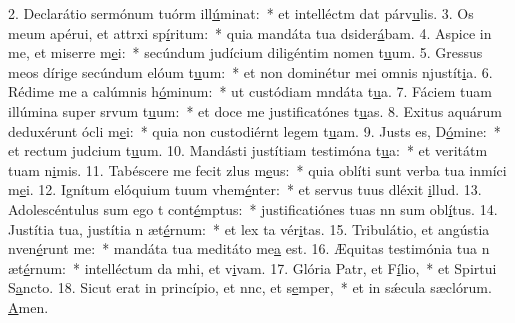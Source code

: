 2. Declarátio sermónum tuórm ill\uline{ú}minat:~* et intelléctm dat párv\uline{u}lis.
3. Os meum apérui, et attrxi sp\uline{í}ritum:~* quia mandáta tua dsider\uline{á}bam.
4. Aspice in me, et miserre m\uline{e}i:~* secúndum judícium diligéntim nomen t\uline{u}um.
5. Gressus meos dírige secúndum elóum t\uline{u}um:~* et non dominétur mei omnis njustít\uline{i}a.
6. Rédime me a calúmnis h\uline{ó}minum:~* ut custódiam mndáta t\uline{u}a.
7. Fáciem tuam illúmina super srvum t\uline{u}um:~* et doce me justificatónes t\uline{u}as.
8. Exitus aquárum deduxérunt ócli m\uline{e}i:~* quia non custodiérnt legem t\uline{u}am.
9. Justs es, D\uline{ó}mine:~* et rectum judcium t\uline{u}um.
10. Mandásti justítiam testimóna t\uline{u}a:~* et veritátm tuam n\uline{i}mis.
11. Tabéscere me fecit zlus m\uline{e}us:~* quia oblíti sunt verba tua inmíci m\uline{e}i.
12. Ignítum elóquium tuum vhem\uline{é}nter:~* et servus tuus dléxit \uline{i}llud.
13. Adolescéntulus sum ego t cont\uline{é}mptus:~* justificatiónes tuas nn sum obl\uline{í}tus.
14. Justítia tua, justítia n æt\uline{é}rnum:~* et lex ta vér\uline{i}tas.
15. Tribulátio, et angústia nven\uline{é}runt me:~* mandáta tua meditáto me\uline{a} est.
16. Æquitas testimónia tua n æt\uline{é}rnum:~* intelléctum da mhi, et v\uline{i}vam.
17. Glória Patr, et F\uline{í}lio,~* et Spirtui S\uline{a}ncto.
18. Sicut erat in princípio, et nnc, et s\uline{e}mper,~* et in sǽcula sæclórum. \uline{A}men.
